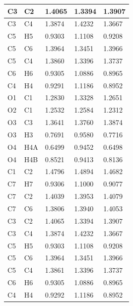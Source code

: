 \begin{table}[H]
\begin{tabular}{|l|l|lll|}
C3 & C2 & \multicolumn{1}{l|}{1.4065} & \multicolumn{1}{l|}{1.3394} & 1.3907 \\ \hline
C3 & C4 & \multicolumn{1}{l|}{1.3874} & \multicolumn{1}{l|}{1.4232} & 1.3667 \\ \hline
C5 & H5 & \multicolumn{1}{l|}{0.9303} & \multicolumn{1}{l|}{1.1108} & 0.9208 \\ \hline
C5 & C6 & \multicolumn{1}{l|}{1.3964} & \multicolumn{1}{l|}{1.3451} & 1.3966 \\ \hline
C5 & C4 & \multicolumn{1}{l|}{1.3860} & \multicolumn{1}{l|}{1.3396} & 1.3737 \\ \hline
C6 & H6 & \multicolumn{1}{l|}{0.9305} & \multicolumn{1}{l|}{1.0886} & 0.8965 \\ \hline
C4 & H4 & \multicolumn{1}{l|}{0.9291} & \multicolumn{1}{l|}{1.1186} & 0.8952 \\ \hline
O1 & C1 & \multicolumn{1}{l|}{1.2830} & \multicolumn{1}{l|}{1.3328} & 1.2651 \\ \hline
O2 & C1 & \multicolumn{1}{l|}{1.2532} & \multicolumn{1}{l|}{1.2584} & 1.2312 \\ \hline
O3 & C3 & \multicolumn{1}{l|}{1.3641} & \multicolumn{1}{l|}{1.3760} & 1.3874 \\ \hline
O3 & H3 & \multicolumn{1}{l|}{0.7691} & \multicolumn{1}{l|}{0.9580} & 0.7716 \\ \hline
O4 & H4A & \multicolumn{1}{l|}{0.6499} & \multicolumn{1}{l|}{0.9452} & 0.6498 \\ \hline
O4 & H4B & \multicolumn{1}{l|}{0.8521} & \multicolumn{1}{l|}{0.9413} & 0.8136 \\ \hline
C1 & C2 & \multicolumn{1}{l|}{1.4796} & \multicolumn{1}{l|}{1.4894} & 1.4682 \\ \hline
C7 & H7 & \multicolumn{1}{l|}{0.9306} & \multicolumn{1}{l|}{1.1000} & 0.9077 \\ \hline
C7 & C2 & \multicolumn{1}{l|}{1.4039} & \multicolumn{1}{l|}{1.3953} & 1.4079 \\ \hline
C7 & C6 & \multicolumn{1}{l|}{1.3806} & \multicolumn{1}{l|}{1.3940} & 1.4053 \\ \hline
C3 & C2 & \multicolumn{1}{l|}{1.4065} & \multicolumn{1}{l|}{1.3394} & 1.3907 \\ \hline
C3 & C4 & \multicolumn{1}{l|}{1.3874} & \multicolumn{1}{l|}{1.4232} & 1.3667 \\ \hline
C5 & H5 & \multicolumn{1}{l|}{0.9303} & \multicolumn{1}{l|}{1.1108} & 0.9208 \\ \hline
C5 & C6 & \multicolumn{1}{l|}{1.3964} & \multicolumn{1}{l|}{1.3451} & 1.3966 \\ \hline
C5 & C4 & \multicolumn{1}{l|}{1.3861} & \multicolumn{1}{l|}{1.3396} & 1.3737 \\ \hline
C6 & H6 & \multicolumn{1}{l|}{0.9305} & \multicolumn{1}{l|}{1.0886} & 0.8965 \\ \hline
C4 & H4 & \multicolumn{1}{l|}{0.9292} & \multicolumn{1}{l|}{1.1186} & 0.8952 \\ \hline
\end{tabular}
\end{table}

